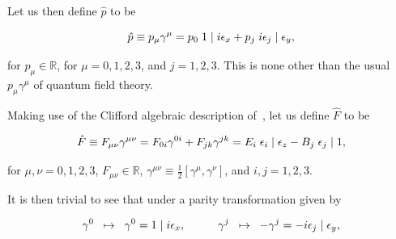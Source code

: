 \documentclass[letterpaper,12pt,titlepage,oneside,final]{book}
\newcommand{\R}{\mathbb{R}}
\begin{document}
Let us then define $\hat{p}$ to be

\begin{equation}\hat{p} \equiv p_{\mu} \gamma^{\mu} = p_0 \hspace{1mm}1\hspace{1mm}|\hspace{1mm}i\epsilon_x + p_j\hspace{1mm} i\epsilon_j \hspace{1mm}| \hspace{1mm}\epsilon_y, 
\end{equation}

\noindent for $p_{\mu}\in\R$, for $\mu = 0,1, 2, 3$, and $j=1,2,3.$ This is none other than the usual $p_{\mu} \gamma^{\mu}$ of quantum field theory.


Making use of  the Clifford algebraic description of~\cite{loun}, let us define $\hat{F}$ to be 

\begin{equation} \hat{F} \equiv F_{\mu\nu}\gamma^{\mu\nu}  = F_{0i}\gamma^{0i} + F_{jk}\gamma^{jk} = E_i\hspace{1mm}\epsilon_{i} \hspace{1mm}|\hspace{1mm} \epsilon_z - B_j\hspace{1mm} \epsilon_j\hspace{1mm}|\hspace{1mm}1,
\end{equation}

\noindent for $\mu, \nu = 0,1, 2, 3$, $F_{\mu\nu}\in \R$,  $\gamma^{\mu\nu}\equiv \frac{1}{2}\left[\gamma^{\mu}, \gamma^{\nu}\right]$, and $i, j = 1,2,3$.


It is then trivial to see that under a parity transformation given by 

\begin{equation} \gamma^0\hspace{2mm}\mapsto\hspace{2mm}\gamma^0 = 1\hspace{1mm}|\hspace{1mm}i\epsilon_x,\hspace{1cm} \gamma^j\hspace{2mm}\mapsto\hspace{2mm}-\gamma^j = -i\epsilon_j \hspace{1mm}| \hspace{1mm}\epsilon_y,
\end{equation}
\end{document}
